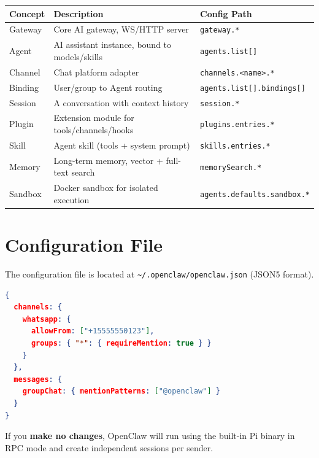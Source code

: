 \begin{center}
\begin{tabular}{lll}
\toprule
\textbf{Concept} & \textbf{Description} & \textbf{Config Path} \\
\midrule
Gateway & Core AI gateway, WS/HTTP server & \texttt{gateway.*} \\
Agent & AI assistant instance, bound to models/skills & \texttt{agents.list[]} \\
Channel & Chat platform adapter & \texttt{channels.<name>.*} \\
Binding & User/group to Agent routing & \texttt{agents.list[].bindings[]} \\
Session & A conversation with context history & \texttt{session.*} \\
Plugin & Extension module for tools/channels/hooks & \texttt{plugins.entries.*} \\
Skill & Agent skill (tools + system prompt) & \texttt{skills.entries.*} \\
Memory & Long-term memory, vector + full-text search & \texttt{memorySearch.*} \\
Sandbox & Docker sandbox for isolated execution & \texttt{agents.defaults.sandbox.*} \\
\bottomrule
\end{tabular}
\end{center}

\section{Configuration File}

The configuration file is located at \texttt{\textasciitilde{}/.openclaw/openclaw.json} (JSON5 format).

\begin{lstlisting}[language=json]
{
  channels: {
    whatsapp: {
      allowFrom: ["+15555550123"],
      groups: { "*": { requireMention: true } }
    }
  },
  messages: {
    groupChat: { mentionPatterns: ["@openclaw"] }
  }
}
\end{lstlisting}

If you \textbf{make no changes}, OpenClaw will run using the built-in Pi binary in RPC mode and create independent sessions per sender.
